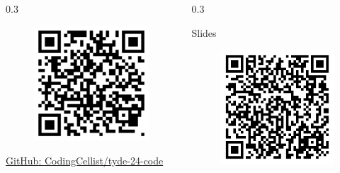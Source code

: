 \documentclass[compress,handout]{beamer}
\begin{document}
\begin{frame}
\begin{columns}
\begin{column}{0.3\framewidth}
\begin{center}
\begin{figure}
        \includegraphics[width=\textwidth]{code-qr.png}
      \end{figure}
      \href{https://github.com/CodingCellist/tyde-24-code}{GitHub: CodingCellist/tyde-24-code}
    \end{center}
  \end{column}
  \begin{column}{0.3\framewidth}
    \begin{center}
      Slides
      \begin{figure}
        \includegraphics[width=\textwidth]{slides-qr.png}

\end{figure}
\end{center}
\end{column}
\end{columns}
\end{frame}
\end{document}
